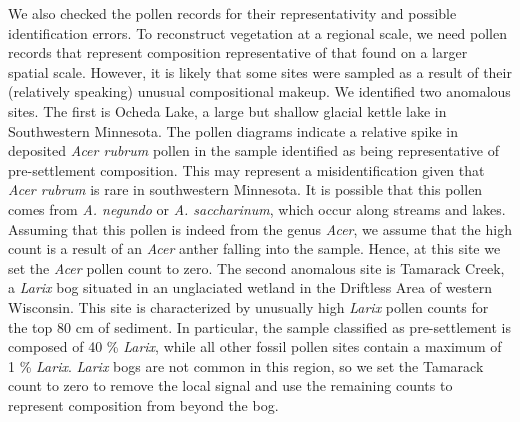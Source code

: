 \documentclass[12pt]{article}
\begin{document}
We also checked the pollen records for their representativity and
possible identification errors. To reconstruct vegetation at a
regional scale, we need pollen records that represent composition
representative of that found on a larger spatial scale. However, it is
likely that some sites were sampled as a result of their (relatively
speaking) unusual compositional makeup. We identified two anomalous
sites. The first is Ocheda Lake, a large but shallow glacial kettle
lake in Southwestern Minnesota. The pollen diagrams indicate a
relative spike in deposited \textit{Acer rubrum} pollen in the sample
identified as being representative of pre-settlement composition. This
may represent a misidentification given that \textit{Acer rubrum} is
rare in southwestern Minnesota. It is possible that this pollen comes
from \textit{A. negundo} or \textit{A. saccharinum}, which occur along
streams and lakes. Assuming that this pollen is indeed from the genus
\textit{Acer}, we assume that the high count is a result of an
\textit{Acer} anther falling into the sample. Hence, at this site we
set the \textit{Acer} pollen count to zero. The second anomalous site
is Tamarack Creek, a \textit{Larix} bog situated in an unglaciated
wetland in the Driftless Area of western Wisconsin. This site is
characterized by unusually high \textit{Larix} pollen counts for the
top 80 cm of sediment. In particular, the sample classified as
pre-settlement is composed of 40 \% \textit{Larix}, while all other
fossil pollen sites contain a maximum of 1 \%
\textit{Larix}. \textit{Larix} bogs are not common in this region, so
we set the Tamarack count to zero to remove the local signal and use
the remaining counts to represent composition from beyond the bog.

\end{document}
